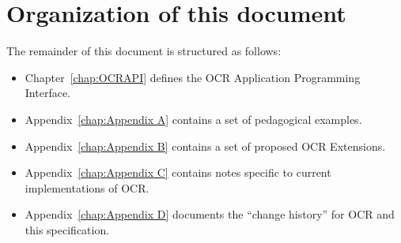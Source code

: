 %





\section{Organization of this document}
\label{sec:Organization of this document}

The remainder of this document is structured as follows:

\begin{itemize}
\item Chapter~\ref{chap:OCRAPI} defines the OCR Application Programming Interface.

\item Appendix~\ref{chap:Appendix A} contains a set of pedagogical examples.

\item Appendix~\ref{chap:Appendix B} contains a set of proposed OCR Extensions.

\item Appendix~\ref{chap:Appendix C} contains notes specific to current implementations of OCR.

\item Appendix~\ref{chap:Appendix D} documents the ``change history''
  for OCR and this specification.
\end{itemize}



